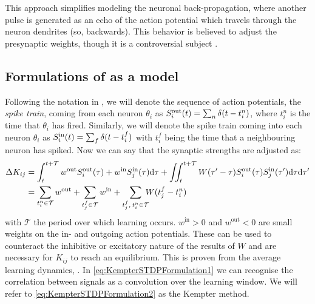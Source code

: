 
This approach simplifies modeling the neuronal back-propagation, where another pulse is generated as an echo of the action potential which travels through the neuron dendrites (so, backwards). This behavior is believed to adjust the presynaptic weights, though it is a controversial subject \cite{Gerstner2002}. 


\subsection{Formulations of \STDP as a model}
Following the notation in \cite{Kempter1999}, we will denote the sequence of action potentials, the \textsl{spike train}, coming from each neuron $\theta_i$ as $S_i^{\rm out}(t) = \sum_{n} \delta (t-t_{i}^{n})$, where $t_{i}^{n}$ is the time that $\theta_i$ has fired. Similarly, we will denote the spike train coming into each neuron $\theta_i$ as $S_i^{\rm in}(t) = \sum_{f} \delta (t-t_{i}^{f})$ with $t_{i}^{f}$ being the time that a neighbouring neuron has spiked. Now we can say that the synaptic strengths are adjusted as:
\begin{align}
\Delta K_{ij} &= \int_{t}^{t+\mathcal{T}} w^{\rm{out}} S_i^{\rm out}(\tau) + w^{\rm{in}} S_{j}^{\rm {in}}(\tau) \mathrm{d}\tau
+ \iint_{t}^{t+\mathcal{T}} W( \tau^\prime - \tau) S_{i}^{\rm out}(\tau) S_{j}^{\rm in}( \tau^\prime) \mathrm{d} \tau \mathrm{d} \tau^\prime
\label{eq:KempterSTDPFormulation1} \\
&= \sum_{t_i^{n}\in \mathcal{T}} w^{\mathrm{out}} + \sum_{t_{j}^{f} \in \mathcal{T}} w^{\mathrm{in}} + \sum_{t_{j}^{f}, \: t_i^{n} \in \mathcal{T}} \hspace{-2mm} W (t_{j}^{f}-t_i^{n} ) \label{eq:KempterSTDPFormulation2}
\end{align}
with $\mathcal{T}$ the period over which learning occurs. $w^{\mathrm{in}} > 0$ and $w^{\mathrm{out}} < 0$ are small weights on the in- and outgoing action potentials. These can be used to counteract the inhibitive or excitatory nature of the results of $W$ and are necessary for $K_{ij}$ to reach an equilibrium. This is proven from the average learning dynamics, \cite{Kempter1999}. In \eqref{eq:KempterSTDPFormulation1} we can recognise the correlation between signals as a convolution over the learning window. We will refer to \eqref{eq:KempterSTDPFormulation2} as the Kempter method. \\

